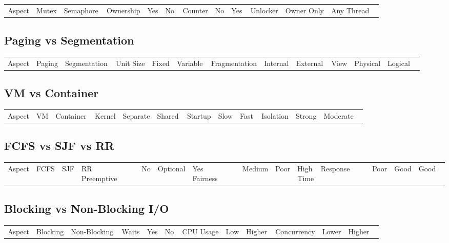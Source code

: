 \begin{longtable}{|p{4cm}|p{5cm}|p{5cm}|}
\hline
Aspect & Mutex & Semaphore \
\hline
Ownership & Yes & No \
\hline
Counter & No & Yes \
\hline
Unlocker & Owner Only & Any Thread \
\hline
\end{longtable}

\subsection*{Paging vs Segmentation}

\begin{longtable}{|p{4cm}|p{5cm}|p{5cm}|}
\hline
Aspect & Paging & Segmentation \
\hline
Unit Size & Fixed & Variable \
\hline
Fragmentation & Internal & External \
\hline
View & Physical & Logical \
\hline
\end{longtable}

\subsection*{VM vs Container}

\begin{longtable}{|p{4cm}|p{5cm}|p{5cm}|}
\hline
Aspect & VM & Container \
\hline
Kernel & Separate & Shared \
\hline
Startup & Slow & Fast \
\hline
Isolation & Strong & Moderate \
\hline
\end{longtable}

\subsection*{FCFS vs SJF vs RR}

\begin{longtable}{|p{4cm}|p{4cm}|p{4cm}|p{4cm}|}
\hline
Aspect & FCFS & SJF & RR \
\hline
Preemptive & No & Optional & Yes \
\hline
Fairness & Medium & Poor & High \
\hline
Response Time & Poor & Good & Good \
\hline
\end{longtable}

\subsection*{Blocking vs Non-Blocking I/O}

\begin{longtable}{|p{5cm}|p{5cm}|p{5cm}|}
\hline
Aspect & Blocking & Non-Blocking \
\hline
Waits & Yes & No \
\hline
CPU Usage & Low & Higher \
\hline
Concurrency & Lower & Higher \
\hline
\end{longtable}

